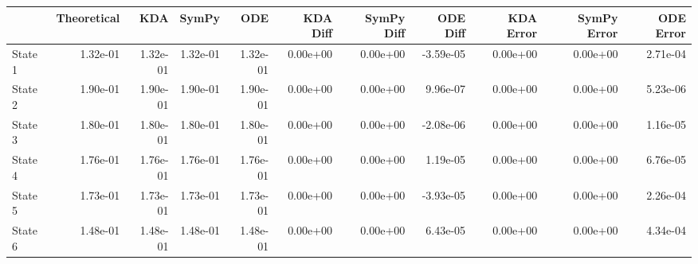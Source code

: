 \begin{tabular}{lrrrrrrrrrr}
\toprule
{} &  Theoretical &      KDA &    SymPy &      ODE &  KDA Diff &  SymPy Diff &  ODE Diff &  KDA Error &  SymPy Error &  ODE Error \\
\midrule
State 1 &     1.32e-01 & 1.32e-01 & 1.32e-01 & 1.32e-01 &  0.00e+00 &    0.00e+00 & -3.59e-05 &   0.00e+00 &     0.00e+00 &   2.71e-04 \\
State 2 &     1.90e-01 & 1.90e-01 & 1.90e-01 & 1.90e-01 &  0.00e+00 &    0.00e+00 &  9.96e-07 &   0.00e+00 &     0.00e+00 &   5.23e-06 \\
State 3 &     1.80e-01 & 1.80e-01 & 1.80e-01 & 1.80e-01 &  0.00e+00 &    0.00e+00 & -2.08e-06 &   0.00e+00 &     0.00e+00 &   1.16e-05 \\
State 4 &     1.76e-01 & 1.76e-01 & 1.76e-01 & 1.76e-01 &  0.00e+00 &    0.00e+00 &  1.19e-05 &   0.00e+00 &     0.00e+00 &   6.76e-05 \\
State 5 &     1.73e-01 & 1.73e-01 & 1.73e-01 & 1.73e-01 &  0.00e+00 &    0.00e+00 & -3.93e-05 &   0.00e+00 &     0.00e+00 &   2.26e-04 \\
State 6 &     1.48e-01 & 1.48e-01 & 1.48e-01 & 1.48e-01 &  0.00e+00 &    0.00e+00 &  6.43e-05 &   0.00e+00 &     0.00e+00 &   4.34e-04 \\
\bottomrule
\end{tabular}
